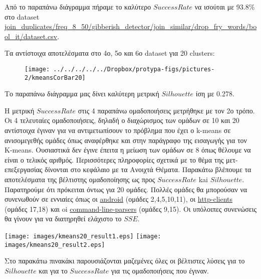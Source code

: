 Από το παραπάνω διάγραμμα πήραμε το καλύτερο $Success Rate$ να ισούται με 93.8\% στο dataset \url{join_duplicates/freq_8_50/gibberish_detector/join_similar/drop_fry_words/bool_it/dataset.csv}.

Τα αντίστοιχα αποτελέσματα στο 4ο, 5ο και 6ο dataset για 20 clusters:

\begin{figure}
\centering
\texttt{[image: ../../../../../Dropbox/protypa-figs/pictures-2/kmeansCorBar20]}
\caption{}
\label{fig:kmeansCorBar20}
\end{figure}

Το παραπάνω διάγραμμα μας δίνει καλύτερη μετρική $Silhouette$ ίση με 0.278.

Η μετρική $Success Rate$ στις 4 παραπάνω ομαδοποιήσεις μετρήθηκε με τον 2ο τρόπο.  
Οι 4 τελευταίες ομαδοποιήσεις, δηλαδή ο διαχώρισμος των ομάδων σε 10 και 20 αντίστοιχα έγιναν για να αντιμετωπίσουν το πρόβλημα που έχει ο k-means σε ανισομεγεθής ομάδες όπως αναφέρθηκε και στην παράγραφο της εισαγωγής για τον K-means. Ουσιαστικά δεν έγινε έπειτα η μείωση των ομάδων σε 8 όπως θέλουμε να είναι ο τελικός αριθμός. Περισσότερες πληροφορίες σχετικά με το θέμα της μετ-επεξεργασίας δίνονται στο κεφάλαιο με τα Ανοιχτά Θέματα.
Παρακάτω βλέπουμε τα αποτελέσματα της βέλτιστης ομαδοποίησης ως προς $Success Rate$ kai $Silhouette$. Παρατηρούμε ότι πρόκειται όντως για 20 ομάδες. Πολλές ομάδες θα μπορούσαν να συνενωθούν σε εννιαίες όπως οι \url{android} (ομάδες 2,4,5,10,11), οι \url{http-clients} (ομάδες 17,18) και oi \url{command-line-parsers} (ομάδες 9,15). Οι υπόλοιπες συνενώσεις θα γίνουν για να διατηρηθεί ελάχιστο το $SSE$.
\\\noindent\begin{minipage}{\linewidth}
    \centering
    \texttt{[image: images/kmeans20\_result1.eps]}
    \texttt{[image: images/kmeans20\_result2.eps]}
    \label{fig:kmeans20_result}
\end{minipage}
Στο παρακάτω πινακάκι παρουσιάζονται μαζεμένες όλες οι βέλτιστες λύσεις για το $Silhouette$ και για το $Success Rate$ για τις ομαδοποιήσεις που έγιναν.

